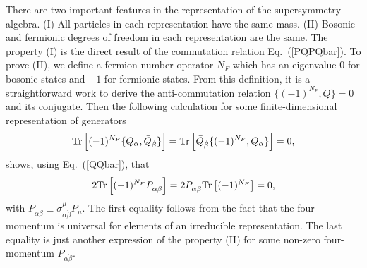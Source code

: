 \documentclass[12pt,twoside,book]{article}
\begin{document}
There are two important features in the representation of the supersymmetry algebra.
(I) All particles in each representation have the same mass.
(II) Bosonic and fermionic degrees of freedom in each representation are the same.
The property (I) is the direct result of the commutation relation Eq.\ (\ref{PQPQbar}).
To prove (II), we define a fermion number operator $N_F$ which has an eigenvalue $0$ for bosonic states and $+1$ for fermionic states.
From this definition, it is a straightforward work to derive the anti-commutation relation $\{(-1)^{N_F},Q\}=0$ and its conjugate.
Then the following calculation for some finite-dimensional representation of generators
\begin{align}
  {\rm Tr} \left[ (-1)^{N_F} \{Q_\alpha, \bar{Q}_{\dot{\beta}}\} \right]
  = {\rm Tr} \left[ \bar{Q}_{\dot{\beta}} \{ (-1)^{N_F}, Q_\alpha \} \right] = 0,
\end{align}
shows, using Eq.\ (\ref{QQbar}), that
\begin{align}
  2{\rm Tr} \left[ (-1)^{N_F} P_{\alpha \dot{\beta}} \right]
  = 2P_{\alpha \dot{\beta}} {\rm Tr} \left[(-1)^{N_F} \right] = 0,
\end{align}
with $P_{\alpha \dot{\beta}} \equiv \sigma^\mu_{\alpha \dot{\beta}} P_\mu$.
The first equality follows from the fact that the four-momentum is universal for elements of an irreducible representation.
The last equality is just another expression of the property (II) for some non-zero four-momentum $P_{\alpha \dot{\beta}}$.
\end{document}
